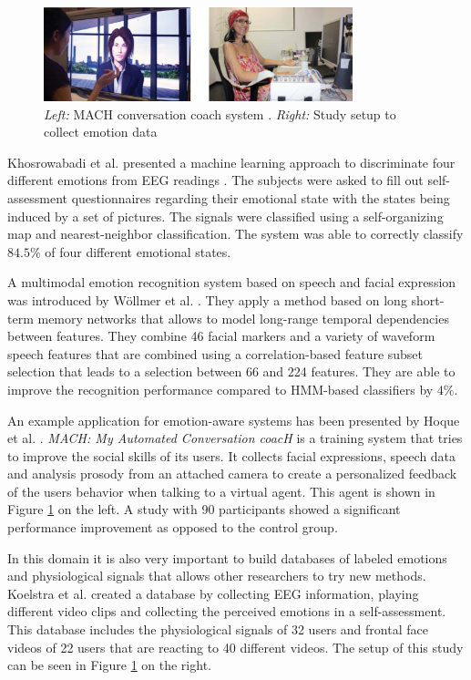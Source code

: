 \begin{figure}[ht]
\centering
\includegraphics[width=0.8\textwidth]{images/rel_app_emotion}
\caption{\emph{Left:} MACH conversation coach system \cite{hoque2013mach}. \emph{Right:} Study setup to collect emotion data \cite{koelstra2012deap}}
\label{fig:rel_app_emotion}
\end{figure}

Khosrowabadi et al. presented a machine learning approach to discriminate four different emotions from EEG readings \cite{khosrowabadi2010eeg}. The subjects were asked to fill out self-assessment questionnaires regarding their emotional state with the states being induced by a set of pictures. The signals were classified using a self-organizing map and nearest-neighbor classification. The system was able to correctly classify $84.5\%$ of four different emotional states.

A multimodal emotion recognition system based on speech and facial expression was introduced by Wöllmer et al.  \cite{wollmer2010context}. They apply a method based on long short-term memory networks that allows to model long-range temporal dependencies between features. They combine 46 facial markers and a variety of waveform speech features that are combined using a correlation-based feature subset selection that leads to a selection between 66 and 224 features. They are able to improve the recognition performance compared to HMM-based classifiers by $4\%$.

An example application for emotion-aware systems has been presented by Hoque et al. \cite{hoque2013mach}. \emph{MACH: My Automated Conversation coacH} is a training system that tries to improve the social skills of its users. It collects facial expressions, speech data and analysis prosody from an attached camera to create a personalized feedback of the users behavior when talking to a virtual agent. This agent is shown in Figure \ref{fig:rel_app_emotion} on the left. A study with 90 participants showed a significant performance improvement as opposed to the control group. 

In this domain it is also very important to build databases of labeled emotions and physiological signals that allows other researchers to try new methods. Koelstra et al. \cite{koelstra2012deap} created a database by collecting EEG information, playing different video clips and collecting the perceived emotions in a self-assessment. This database includes the physiological signals of 32 users and frontal face videos of 22 users that are reacting to 40 different videos. The setup of this study can be seen in Figure \ref{fig:rel_app_emotion} on the right.


